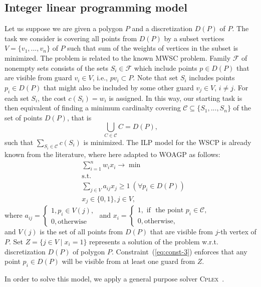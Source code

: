 \documentclass[runningheads,a4paper]{elsarticle}
\begin{document}
	\subsection{Integer linear programming model}
	Let us suppose we are given a polygon $P$ and a discretization $D(P)$ of $P$.  The task we consider is covering all points from $D(P)$ by a subset vertices $V=\{v_1,...,v_n\}$ of $P$ such that sum of the weights of vertices in the subset is minimized.
	The problem is related to the known MWSC problem.
	Family $\mathcal{F}$ of nonempty sets consists of the sets
	$S_i \in \mathcal{F}$ which include points $p \in D(P)$ that are visible from guard $v_i\in V$, i.e., $pv_i \subset P$.  Note that set $S_i$ includes points $p_i\in D(P)$ that might also be included by some other guard $v_j\in V$, $i \neq j$. For each set $S_i$, the cost $c(S_i) = w_i$ is assigned.  In this way, our starting task is then equivalent of finding a minimum cardinalty covering $\mathcal{C}\subseteq\{S_1,...,S_n\}$ of the set of points $D(P)$, that is
	$$ \bigcup_{C \in \mathcal{C}} C = D(P),$$ such that $\sum_{S_i \in \mathcal{C}} c(S_i)$ is minimized.  The ILP  model for the WSCP is already known from the literature, where  here adapted to WOAGP  as follows:
	\begin{align}
	&\sum_{i=1}^n w_ix_i \longrightarrow \min \\
	&\mbox{s.t.} \\
	&\sum_{j\in V} a_{ij}x_j \geq 1\ (\forall p_i\in D(P)) \label{eq:const-3}\\
	& x_j \in \{0,1\}, j \in V,
	\end{align}
	where
	$a_{ij} = \begin{cases}
	1, p_i \in V(j), \\
	0, \mbox{otherwise}
	\end{cases}$
	and $x_i = \begin{cases}
	1, \mbox{ if } \mbox{ the point } p_i \in \mathcal{C},\\
	0, \mbox{otherwise},
	\end{cases}$ \\
	and $V(j)$ is the set of all points from $D(P)$ that are visible from $j$-th vertex of $P$.
	Set $Z = \{j \in V\mid x_i=1\}$ represents a solution of the problem w.r.t. discretization $D(P)$ of polygon $P$.
	Constraint~(\ref{eq:const-3}) enforces that any point $p_i \in D(P)$ will be visible from at least one guard from $Z$.
	
	
	In order to solve this model, we apply a general purpose solver \textsc{Cplex}~\cite{lima2010ibm}.
\end{document}
